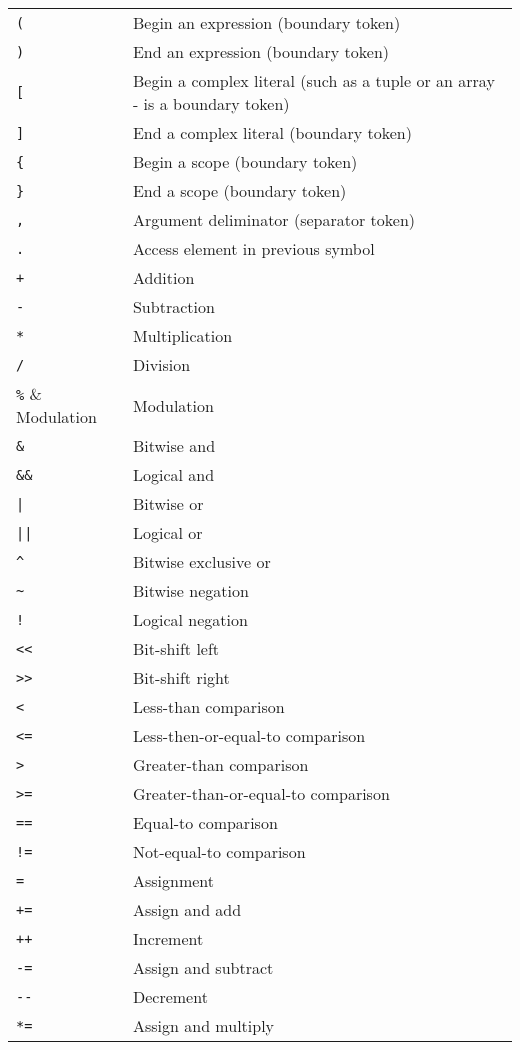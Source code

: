 \documentclass[10pt,a4paper]{article}
\begin{document}
\begin{tabular}{l l}
\verb|(| & Begin an expression (boundary token) \\
\verb|)| & End an expression (boundary token) \\
\verb|[| & Begin a complex literal (such as a tuple or an array - is a boundary token) \\
\verb|]| & End a complex literal (boundary token) \\
\verb|{| & Begin a scope (boundary token) \\
\verb|}| & End a scope (boundary token) \\
\verb|,| & Argument deliminator (separator token) \\
\verb|.| & Access element in previous symbol \\
\verb|+| & Addition \\
\verb|-| & Subtraction \\
\verb|*| & Multiplication \\
\verb|/| & Division \\
\verb|%| & Modulation \\
\verb|&| & Bitwise and \\
\verb|&&| & Logical and \\
\verb/|/ & Bitwise or \\
\verb/||/ & Logical or \\
\verb|^| & Bitwise exclusive or \\
\verb|~| & Bitwise negation \\
\verb|!| & Logical negation \\
\verb|<<| & Bit-shift left \\
\verb|>>| & Bit-shift right \\
\verb|<| & Less-than comparison \\
\verb|<=| & Less-then-or-equal-to comparison \\
\verb|>| & Greater-than comparison \\
\verb|>=| & Greater-than-or-equal-to comparison \\
\verb|==| & Equal-to comparison \\
\verb|!=| & Not-equal-to comparison \\
\verb|=| & Assignment \\
\verb|+=| & Assign and add \\
\verb|++| & Increment \\
\verb|-=| & Assign and subtract \\
\verb|--| & Decrement \\
\verb|*=| & Assign and multiply \\

\end{tabular}
\end{document}
